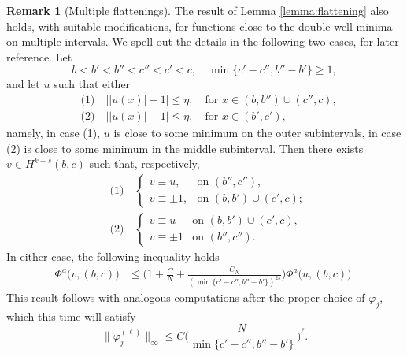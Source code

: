 \documentclass{article}
\theoremstyle{definition}
\newtheorem{Remark}[Theorem]{Remark}
\newcommand{\de}{\mathrm{d}}
\let\phi\varphi
\let\l\ell
\begin{document}
\begin{Remark}[Multiple flattenings]\label{rmk:multiple_flattening}
The result of Lemma \ref{lemma:flattening} also holds, with suitable modifications, for functions close to the double-well minima on multiple intervals. We spell out the details in the following two cases, for later reference. Let 
\[b<b'<b''<c''<c'< c,\quad \min\{c'-c'', b''-b'\}\ge 1,\] 
and let $u$ such that either
\[
\begin{split}
    &\text{(1)}\quad \big||u(x)|-1\big|\leq \eta, \quad \text{for }x\in (b,b'')\cup (c'',c),\\
    &\text{(2)}\quad  \big||u(x)|-1\big|\leq \eta, \quad \text{for }x\in (b',c'),
\end{split}\]
namely, in case (1), $u$ is close to some minimum on the outer subintervals, in case (2) is close to some minimum in the middle subinterval.
Then there exists $v\in H^{k+s}(b,c)$ such that, respectively, 
\[\begin{split}
    &\text{(1)}\quad\begin{cases}
         v\equiv u, &\text{on }(b'',c''), \\
        v\equiv\pm 1, &\text{on }(b,b')\cup(c',c);
    \end{cases}    \\
    &\text{(2)}\quad\begin{cases}
         v\equiv u &\text{on }(b,b')\cup (c',c), \\
          v\equiv\pm 1 &\text{on }(b'',c'').
    \end{cases}
\end{split}\]
In either case, the following inequality holds
%
%
\begin{equation*}
\begin{split}
        \Phi^a\big(v, (b,c)\big)
        &\leq \bigg(1+ \frac{C}{N}+\frac{C_{N}}{(\min\{c'-c'', b''-b'\})^{2s}}\bigg)\Phi^a\big(u, (b,c)\big).
\end{split}
\end{equation*}
This result follows with analogous computations after the proper choice of $\phi_j$, which this time will satisfy 
\[\|\phi_j^{(\l)}\|_\infty\leq C \Big(\frac{N}{\min\{c'-c'',b''-b'\}}\,\Big)^\l.\]
\end{Remark}
\end{document}
